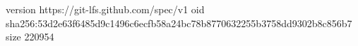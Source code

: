 version https://git-lfs.github.com/spec/v1
oid sha256:53d2e63f6485d9c1496c6ecfb58a24bc78b8770632255b3758dd9302b8c856b7
size 220954
